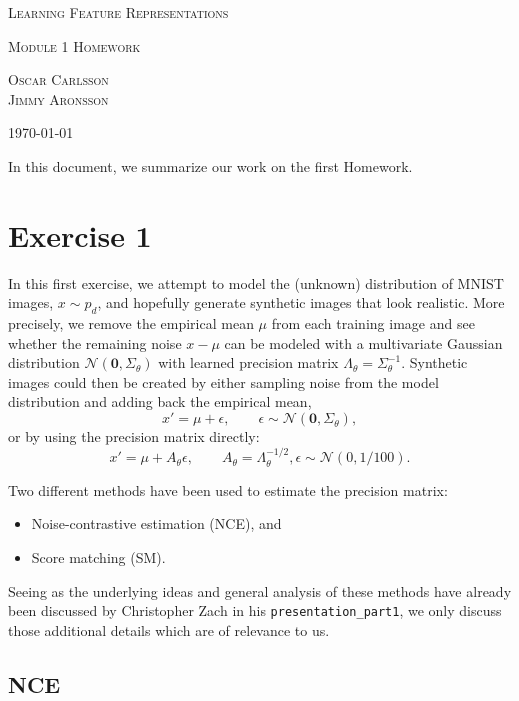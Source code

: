 \documentclass[a4paper]{article}
\theoremstyle{definition}
\theoremstyle{plain}
\begin{document}
{\center\Large\scshape Learning Feature Representations\par}
{\center\large\scshape Module 1 Homework\par}
\vspace{2mm}
{\center\scshape Oscar Carlsson\\Jimmy Aronsson\par}
\vspace{1mm}
{\center\small\scshape \today\par}
\vspace{7mm}

In this document, we summarize our work on the first Homework.

\section*{\center Exercise 1}

In this first exercise, we attempt to model the (unknown) distribution of MNIST images, $x \sim p_d$, and hopefully generate synthetic images that look realistic. More precisely, we remove the empirical mean $\mu$ from each training image and see whether the remaining noise $x - \mu$ can be modeled with a multivariate Gaussian distribution $\mathcal{N}(\mathbf{0},\Sigma_\theta)$ with learned precision matrix $\Lambda_\theta = \Sigma_\theta^{-1}$. Synthetic images could then be created by either sampling noise from the model distribution and adding back the empirical mean, 
$$x' = \mu + \epsilon, \qquad \epsilon \sim \mathcal{N}(\mathbf{0},\Sigma_\theta),$$
or by using the precision matrix directly:
$$x' = \mu + A_\theta \epsilon, \qquad A_\theta = \Lambda_\theta^{-1/2}, \epsilon \sim \mathcal{N}(0,1/100).$$

Two different methods have been used to estimate the precision matrix:
\begin{itemize}
\item Noise-contrastive estimation (NCE), and
\item Score matching (SM).
\end{itemize}
Seeing as the underlying ideas and general analysis of these methods have already been discussed by Christopher Zach in his \texttt{presentation\_part1}, we only discuss those additional details which are of relevance to us.

\subsection*{NCE}
\end{document}
